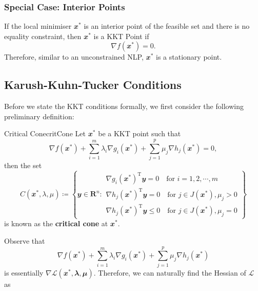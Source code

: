 \documentclass[math, code]{amznotes}
\theoremstyle{remark}
\begin{document}
\subsubsection{Special Case: Interior Points}
If the local minimiser $\mathbfit{x}^*$ is an interior point of the feasible set and there is no equality constraint, then $\mathbfit{x}^*$ is a KKT Point if 
\begin{equation*}
    \nabla f(\mathbfit{x}^*) = 0.
\end{equation*}
Therefore, similar to an unconstrained NLP, $\mathbfit{x}^*$ is a stationary point.

\subsection{Karush-Kuhn-Tucker Conditions}
Before we state the KKT conditions formally, we first consider the following preliminary definition:
\begin{dfnbox}{Critical Cone}{critCone}
    Let $\mathbfit{x}^*$ be a KKT point such that
    \begin{equation*}
        \nabla f(\mathbfit{x}^*) + \sum_{i = 1}^{m}\lambda_i\nabla g_i(\mathbfit{x}^*) + \sum_{j = 1}^{p}\mu_j\nabla h_j(\mathbfit{x}^*) = \mathbfit{0},
    \end{equation*}
    then the set
    \begin{equation*}
        C(\mathbfit{x}^*, \lambda, \mu) \coloneqq \left\{\mathbfit{y} \in \mathbf{R}^n \colon \begin{array}{l}
            \nabla g_i(\mathbfit{x}^*)^{\mathrm{T}}\mathbfit{y} = 0 \quad\textrm{for } i = 1, 2, \cdots, m \\
            \nabla h_j(\mathbfit{x}^*)^{\mathrm{T}}\mathbfit{y} = 0 \quad\textrm{for } j \in J(\mathbfit{x^*}), \mu_j > 0 \\
            \nabla h_j(\mathbfit{x}^*)^{\mathrm{T}}\mathbfit{y} \leq 0 \quad\textrm{for } j \in J(\mathbfit{x^*}), \mu_j = 0
        \end{array}\right\}
    \end{equation*}
    is known as the {\color{red} \textbf{critical cone}} at $\mathbfit{x}^*$.
\end{dfnbox}
Observe that
\begin{equation*}
    \nabla f(\mathbfit{x}^*) + \sum_{i = 1}^{m}\lambda_i\nabla g_i(\mathbfit{x}^*) + \sum_{j = 1}^{p}\mu_j\nabla h_j(\mathbfit{x}^*)
\end{equation*}
is essentially $\nabla \mathcal{L}(\mathbfit{x}^*, \mathbfit{\lambda}, \mathbfit{\mu})$. Therefore, we can naturally find the Hessian of $\mathcal{L}$ as
\end{document}
